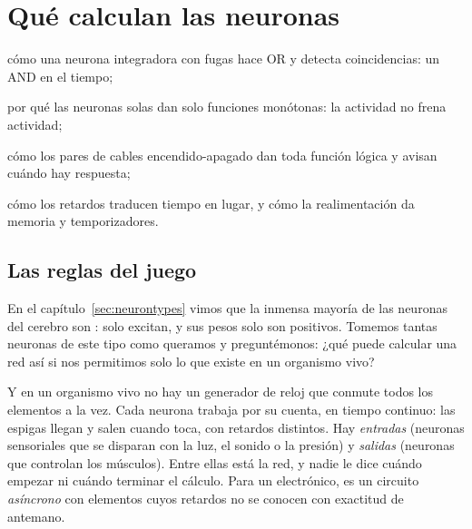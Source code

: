 \chapter{Qué calculan las neuronas }
\label{sec:glutcomputer}
\begin{chaptergoals}
\item cómo una neurona integradora con fugas hace OR y detecta coincidencias: un AND en el tiempo;
\item por qué las neuronas  solas dan solo funciones monótonas: la actividad no frena actividad;
\item cómo los pares de cables encendido-apagado dan toda función lógica y avisan cuándo hay respuesta;
\item cómo los retardos traducen tiempo en lugar, y cómo la realimentación da memoria y temporizadores.
\end{chaptergoals}

\section{Las reglas del juego}

En el capítulo~\ref{sec:neurontypes} vimos que la inmensa mayoría de las neuronas del cerebro son : solo excitan, y sus pesos solo son positivos. Tomemos tantas neuronas de este tipo como queramos y preguntémonos: ¿qué puede calcular una red así si nos permitimos solo lo que existe en un organismo vivo?

Y en un organismo vivo no hay un generador de reloj que conmute todos los elementos a la vez. Cada neurona trabaja por su cuenta, en tiempo continuo: las espigas llegan y salen cuando toca, con retardos distintos. Hay \emph{entradas} (neuronas sensoriales que se disparan con la luz, el sonido o la presión) y \emph{salidas} (neuronas que controlan los músculos). Entre ellas está la red, y nadie le dice cuándo empezar ni cuándo terminar el cálculo. Para un electrónico, es un circuito \emph{asíncrono} con elementos cuyos retardos no se conocen con exactitud de antemano.

